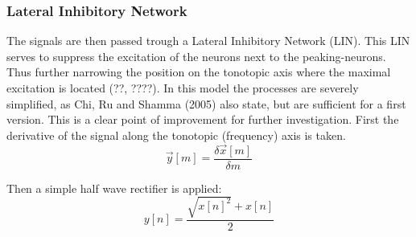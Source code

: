 \documentclass{article}
\begin{document}
\subsubsection{Lateral Inhibitory Network}
The signals are then passed trough a Lateral Inhibitory Network (LIN). This LIN serves to suppress the excitation of the neurons next to the peaking-neurons. Thus further narrowing the position on the tonotopic axis where the maximal excitation is located (??, ????).
In this model the processes are severely simplified, as Chi, Ru and Shamma (2005) also state, but are sufficient for a first version. This is a clear point of improvement for further investigation.
First the derivative of the signal along the tonotopic (frequency) axis is taken.
\begin{equation*}
    \vec{y}[m] = \frac{\delta \vec{x}[m]}{\delta m}
\end{equation*}

Then a simple half wave rectifier is applied:
\begin{equation*}
    y[n] = \frac{\sqrt{x[n]^{2}} + x[n]}{2}
\end{equation*}


\end{document}
